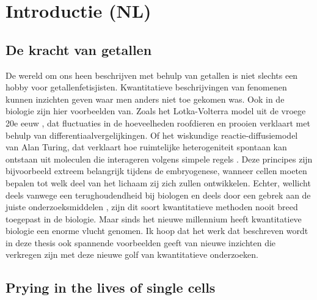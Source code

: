 

\chapter*{Introductie (NL)}




\section*{De kracht van getallen}

De wereld om ons heen beschrijven met behulp van getallen is niet slechts een hobby voor getallenfetisjisten.
Kwantitatieve beschrijvingen van fenomenen kunnen inzichten geven waar men anders niet toe gekomen was.
%
Ook in de biologie zijn hier voorbeelden van.
%
Zoals het Lotka-Volterra model uit de vroege 20e eeuw \cite{Lotka1920,Volterra1928}, dat fluctuaties in de hoeveelheden roofdieren en prooien verklaart met behulp van differentiaalvergelijkingen.
%
Of het wiskundige reactie-diffusiemodel van Alan Turing,
dat verklaart hoe ruimtelijke heterogeniteit spontaan kan ontstaan uit moleculen die 
interageren volgens simpele regels \cite{Turing1952}.
%
Deze principes zijn bijvoorbeeld extreem belangrijk tijdens de embryogenese, wanneer cellen moeten bepalen tot welk deel van het lichaam zij zich zullen ontwikkelen.
%
Echter,
wellicht deels vanwege een terughoudendheid bij biologen  \cite{Lazebnik2003} en deels door een gebrek aan de juiste onderzoeksmiddelen \cite{Kitano2002, Wollman2018}, 
zijn dit soort kwantitatieve methoden nooit breed toegepast in de biologie.
%
Maar sinds het nieuwe millennium heeft kwantitatieve biologie
een enorme vlucht genomen.
%
Ik hoop dat het werk dat beschreven wordt in deze thesis ook spannende voorbeelden geeft van nieuwe inzichten die verkregen zijn met deze nieuwe golf van kwantitatieve onderzoeken.




\section{Prying in the lives of single cells}

